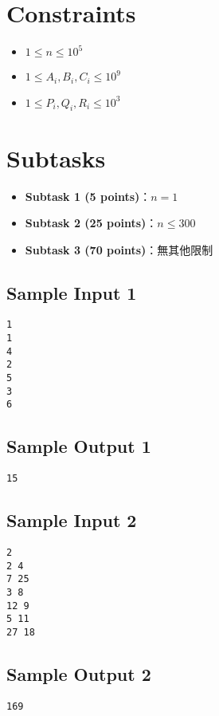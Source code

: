 \documentclass[12pt, a4paper]{article}
\begin{document}
\section*{Constraints}
\begin{itemize}
    \item $1 \le n \le 10^5$
    \item $1 \le A_i, B_i, C_i \le 10^9$
    \item $1 \le P_i, Q_i, R_i \le 10^3$
\end{itemize}

\section*{Subtasks}
\begin{itemize}
    \item \textbf{Subtask 1 (5 points)}：$n = 1$
    \item \textbf{Subtask 2 (25 points)}：$n \le 300$
    \item \textbf{Subtask 3 (70 points)}：無其他限制
\end{itemize}

\begin{paracol}{2}
    \subsection*{Sample Input 1}
    \begin{lstlisting}
1
1
4
2
5
3
6        
    \end{lstlisting}
    \switchcolumn
    \subsection*{Sample Output 1}
    \begin{lstlisting}
15
    \end{lstlisting}
\end{paracol}

\begin{paracol}{2}
    \subsection*{Sample Input 2}
    \begin{lstlisting}
2
2 4
7 25
3 8
12 9
5 11
27 18        
    \end{lstlisting}
    \switchcolumn
    \subsection*{Sample Output 2}
    \begin{lstlisting}
169
    \end{lstlisting}
\end{paracol}
\end{document}

